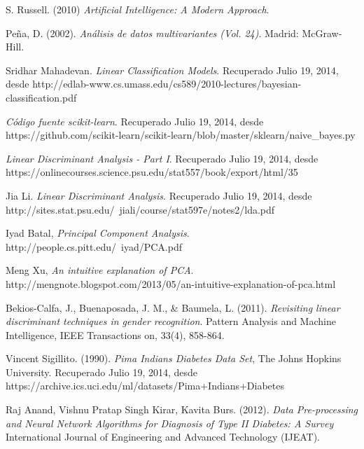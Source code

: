 \documentclass[letter, titlepage, 10pt]{article}
\begin{document}
\begin{thebibliography}{10} %
     S. Russell. (2010) {\em Artificial Intelligence: A Modern Approach}.

     Peña, D. (2002). {\em Análisis de datos multivariantes (Vol. 24)}. Madrid: McGraw-Hill.

     Sridhar Mahadevan. {\em Linear Classification Models}. Recuperado Julio 19, 2014, desde http://edlab-www.cs.umass.edu/cs589/2010-lectures/bayesian-classification.pdf
    
     {\em Código fuente scikit-learn}. Recuperado Julio 19, 2014, desde https://github.com/scikit-learn/scikit-learn/blob/master/sklearn/naive\_bayes.py
    
     {\em Linear Discriminant Analysis - Part I}. Recuperado Julio 19, 2014, desde https://onlinecourses.science.psu.edu/stat557/book/export/html/35
    
     Jia Li. {\em  Linear Discriminant Analysis}. Recuperado Julio 19, 2014, desde http://sites.stat.psu.edu/~jiali/course/stat597e/notes2/lda.pdf
    
     Iyad Batal, {\em Principal Component Analysis}. http://people.cs.pitt.edu/~iyad/PCA.pdf

     Meng Xu, {\em An intuitive explanation of PCA}. http://mengnote.blogspot.com/2013/05/an-intuitive-explanation-of-pca.html

     Bekios-Calfa, J., Buenaposada, J. M., \& Baumela, L. (2011). {\em Revisiting linear discriminant techniques in gender recognition}. Pattern Analysis and Machine Intelligence, IEEE Transactions on, 33(4), 858-864.
    
     Vincent Sigillito. (1990). {\em Pima Indians Diabetes Data Set}, The Johns Hopkins University. Recuperado Julio 19, 2014, desde https://archive.ics.uci.edu/ml/datasets/Pima+Indians+Diabetes
    
     Raj Anand, Vishnu Pratap Singh Kirar, Kavita Burs. (2012). {\em Data Pre-processing and Neural Network Algorithms for Diagnosis of Type II Diabetes: A Survey} International Journal of Engineering and Advanced Technology (IJEAT).
\end{thebibliography}
\end{document}
